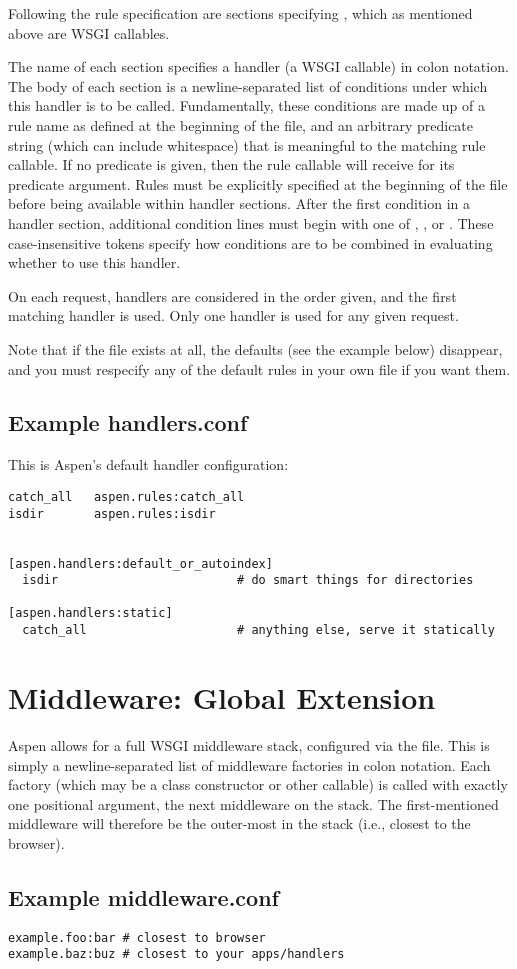 Following the rule specification are sections specifying , which
as mentioned above are WSGI callables.

The name of each section specifies a handler (a WSGI callable) in colon
notation. The body of each section is a newline-separated list of conditions
under which this handler is to be called. Fundamentally, these conditions are
made up of a rule name as defined at the beginning of the file, and an arbitrary
predicate string (which can include whitespace) that is meaningful to the
matching rule callable. If no predicate is given, then the rule callable will
receive  for its predicate argument. Rules must be explicitly
specified at the beginning of the file before being available within handler
sections. After the first condition in a handler section, additional condition
lines must begin with one of , , or . These
case-insensitive tokens specify how conditions are to be combined in evaluating
whether to use this handler.

On each request, handlers are considered in the order given, and the first
matching handler is used. Only one handler is used for any given request.

Note that if the file  exists at all, the defaults
(see the example below) disappear, and you must respecify any of the default
rules in your own file if you want them.


\subsection{Example handlers.conf}
This is Aspen's default handler configuration:

\begin{verbatim}
catch_all   aspen.rules:catch_all
isdir       aspen.rules:isdir


[aspen.handlers:default_or_autoindex]
  isdir                         # do smart things for directories

[aspen.handlers:static]
  catch_all                     # anything else, serve it statically
\end{verbatim}


\section{Middleware: Global Extension \label{middleware}}

Aspen allows for a full WSGI middleware stack, configured via the
 file. This is simply a newline-separated list of
middleware factories in colon notation. Each factory (which may be a class
constructor or other callable) is called with exactly one positional argument,
the next middleware on the stack. The first-mentioned middleware will therefore
be the outer-most in the stack (i.e., closest to the browser).


\subsection{Example middleware.conf}

\begin{verbatim}
example.foo:bar # closest to browser
example.baz:buz # closest to your apps/handlers
\end{verbatim}